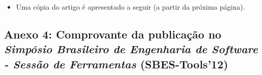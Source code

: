 \begin{figure}[!h]
 \centering
 \label{fig:comprovante_vmil}
\end{figure}

\begin{itemize}
	\item Uma cópia do artigo é apresentado a seguir (a partir da próxima página).
\end{itemize}
\clearpage



\subsection*{Anexo 4: Comprovante da publicação no \emph{Simpósio Brasileiro de Engenharia de Software - Sessão de Ferramentas} (SBES-Tools'12)} \label{anexo:comprovante_SBES}

